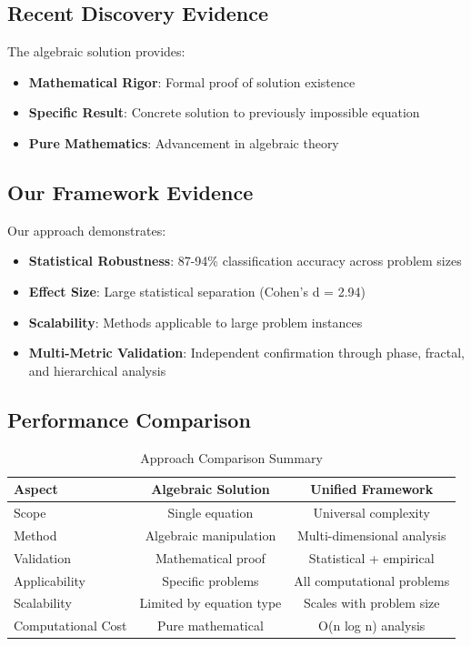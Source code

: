 \documentclass[12pt]{article}
\begin{document}
\subsection{Recent Discovery Evidence}

The algebraic solution provides:
\begin{itemize}
    \item \textbf{Mathematical Rigor}: Formal proof of solution existence
    \item \textbf{Specific Result}: Concrete solution to previously impossible equation
    \item \textbf{Pure Mathematics}: Advancement in algebraic theory
\end{itemize}

\subsection{Our Framework Evidence}

Our approach demonstrates:
\begin{itemize}
    \item \textbf{Statistical Robustness}: 87-94\% classification accuracy across problem sizes
    \item \textbf{Effect Size}: Large statistical separation (Cohen's d = 2.94)
    \item \textbf{Scalability}: Methods applicable to large problem instances
    \item \textbf{Multi-Metric Validation}: Independent confirmation through phase, fractal, and hierarchical analysis
\end{itemize}

\subsection{Performance Comparison}

\begin{table}[h]
\centering
\caption{Approach Comparison Summary}
\begin{tabular}{@{}lcc@{}}
\toprule
Aspect & Algebraic Solution & Unified Framework \\
\midrule
Scope & Single equation & Universal complexity \\
Method & Algebraic manipulation & Multi-dimensional analysis \\
Validation & Mathematical proof & Statistical + empirical \\
Applicability & Specific problems & All computational problems \\
Scalability & Limited by equation type & Scales with problem size \\
Computational Cost & Pure mathematical & O(n log n) analysis \\
\bottomrule
\end{tabular}
\end{table}
\end{document}
